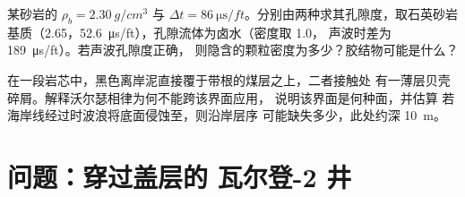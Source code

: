 \begin{exercise}[$\star\star\star$]\label{exo:b3:facies-models:11}
某砂岩的 $\rho_b = \qty{2.30}{g/cm^3}$ 与 $\Delta t =
\qty{86}{\micro\second/ft}$。分别由两种求其孔隙度，取石英砂岩
基质（2.65，\qty{52.6}{\micro\second/ft}），孔隙流体为卤水（密度取 1.0，
声波时差为 \qty{189}{\micro\second/ft}）。若声波孔隙度正确，
则隐含的颗粒密度为多少？胶结物可能是什么？
\end{exercise}

\begin{exercise}[$\star\star\star$]\label{exo:b3:facies-models:12}
在一段岩芯中，黑色离岸泥直接覆于带根的煤层之上，二者接触处
有一薄层贝壳碎屑。解释沃尔瑟相律为何不能跨该界面应用，
说明该界面是何种面，并估算
若海岸线经过时波浪将底面侵蚀至，则沿岸层序
可能缺失多少，此处约深 \qty{10}{m}。
\end{exercise}

\section{问题：穿过盖层的 瓦尔登-2 井}

